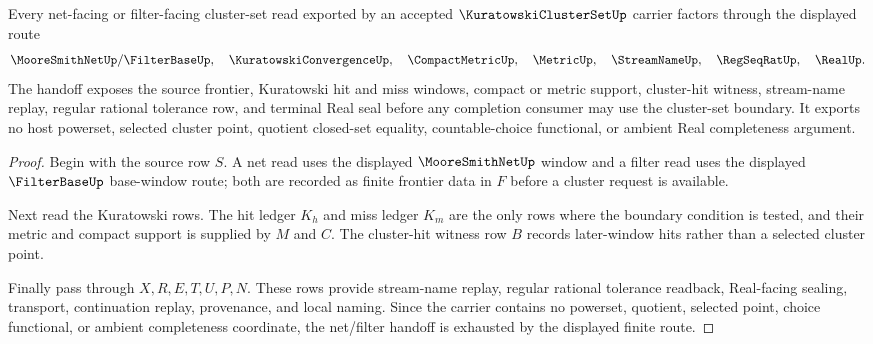 \begin{theorem}
\label{thm:kuratowski-cluster-set-net-filter-handoff}
Every net-facing or filter-facing cluster-set read exported by an accepted $\KuratowskiClusterSetUp$ carrier factors through the displayed route
$$
\MooreSmithNetUp/\FilterBaseUp,\quad \KuratowskiConvergenceUp,\quad \CompactMetricUp,\quad \MetricUp,\quad \StreamNameUp,\quad \RegSeqRatUp,\quad \RealUp .
$$
The handoff exposes the source frontier, Kuratowski hit and miss windows, compact or metric support, cluster-hit witness, stream-name replay, regular rational tolerance row, and terminal Real seal before any completion consumer may use the cluster-set boundary. It exports no host powerset, selected cluster point, quotient closed-set equality, countable-choice functional, or ambient Real completeness argument.
\end{theorem}
\begin{proof}
Begin with the source row $S$. A net read uses the displayed $\MooreSmithNetUp$ window and a filter read uses the displayed $\FilterBaseUp$ base-window route; both are recorded as finite frontier data in $F$ before a cluster request is available.

Next read the Kuratowski rows. The hit ledger $K_h$ and miss ledger $K_m$ are the only rows where the boundary condition is tested, and their metric and compact support is supplied by $M$ and $C$. The cluster-hit witness row $B$ records later-window hits rather than a selected cluster point.

Finally pass through $X,R,E,T,U,P,N$. These rows provide stream-name replay, regular rational tolerance readback, Real-facing sealing, transport, continuation replay, provenance, and local naming. Since the carrier contains no powerset, quotient, selected point, choice functional, or ambient completeness coordinate, the net/filter handoff is exhausted by the displayed finite route.
\end{proof}

